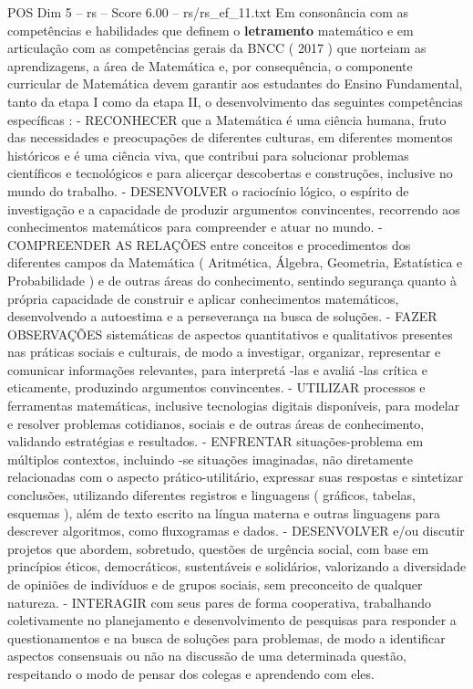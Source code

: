 \begin{textsample}{POS Dim 5 – rs – Score 6.00 – rs/rs\_ef\_11.txt}
Em consonância com as competências e habilidades que definem o \textbf{letramento} matemático e em articulação com as competências gerais da BNCC ( 2017 ) que norteiam as aprendizagens, a área de Matemática e, por consequência, o componente curricular de Matemática devem garantir aos estudantes do Ensino Fundamental, tanto da etapa I como da etapa II, o desenvolvimento das seguintes competências específicas : - RECONHECER que a Matemática é uma ciência humana, fruto das necessidades e preocupações de diferentes culturas, em diferentes momentos históricos e é uma ciência viva, que contribui para solucionar problemas científicos e tecnológicos e para alicerçar descobertas e construções, inclusive no mundo do trabalho. - DESENVOLVER o raciocínio lógico, o espírito de investigação e a capacidade de produzir argumentos convincentes, recorrendo aos conhecimentos matemáticos para compreender e atuar no mundo. - COMPREENDER AS RELAÇÕES entre conceitos e procedimentos dos diferentes campos da Matemática ( Aritmética, Álgebra, Geometria, Estatística e Probabilidade ) e de outras áreas do conhecimento, sentindo segurança quanto à própria capacidade de construir e aplicar conhecimentos matemáticos, desenvolvendo a autoestima e a perseverança na busca de soluções. - FAZER OBSERVAÇÕES sistemáticas de aspectos quantitativos e qualitativos presentes nas práticas sociais e culturais, de modo a investigar, organizar, representar e comunicar informações relevantes, para interpretá -las e avaliá -las crítica e eticamente, produzindo argumentos convincentes. - UTILIZAR processos e ferramentas matemáticas, inclusive tecnologias digitais disponíveis, para modelar e resolver problemas cotidianos, sociais e de outras áreas de conhecimento, validando estratégias e resultados. - ENFRENTAR situações-problema em múltiplos contextos, incluindo -se situações imaginadas, não diretamente relacionadas com o aspecto prático-utilitário, expressar suas respostas e sintetizar conclusões, utilizando diferentes registros e linguagens ( gráficos, tabelas, esquemas ), além de texto escrito na língua materna e outras linguagens para descrever algoritmos, como fluxogramas e dados. - DESENVOLVER e/ou discutir projetos que abordem, sobretudo, questões de urgência social, com base em princípios éticos, democráticos, sustentáveis e solidários, valorizando a diversidade de opiniões de indivíduos e de grupos sociais, sem preconceito de qualquer natureza. - INTERAGIR com seus pares de forma cooperativa, trabalhando coletivamente no planejamento e desenvolvimento de pesquisas para responder a questionamentos e na busca de soluções para problemas, de modo a identificar aspectos consensuais ou não na discussão de uma determinada questão, respeitando o modo de pensar dos colegas e aprendendo com eles.

\end{textsample}
